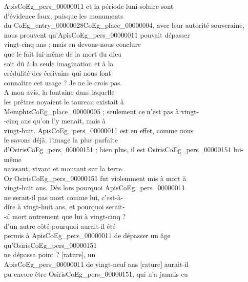 \documentclass{book}
\begin{document}
{\begin{paracol}{2}
\switchcolumn
\noindent Apis\gls{CoEg_pers_00000011} et la période luni-solaire sont\\
d’évidence faux, puisque les monuments\\
du \Gls{CoEg_entry_00000028}\gls{CoEg_place_00000004}, avec leur autorité souveraine,\\
nous prouvent qu’Apis\gls{CoEg_pers_00000011} pouvait dépasser\\
vingt-cinq ans ; mais en devons-nous conclure\\
que le fait lui-même de la mort du dieu\\
soit dû à la seule imagination et à la\\
crédulité des écrivains qui nous font\\
connaître cet usage ? Je ne le crois pas.\\
A mon avis, la fontaine dans laquelle\\
les prêtres noyaient le taureau existait à\\
Memphis\gls{CoEg_place_00000005} ; seulement ce n’est pas à vingt-\\
-cinq ans qu’on l’y menait, mais à\\
vingt-huit. Apis\gls{CoEg_pers_00000011} est en effet, comme nous\\
le savons déjà, l’image la plus parfaite\\
d’Osiris\gls{CoEg_pers_00000151} ; bien plus, il est Osiris\gls{CoEg_pers_00000151} lui-même\\
naissant, vivant et mourant sur la terre.\\
Or Osiris\gls{CoEg_pers_00000151} fut violemment mis à mort à\\
vingt-huit ans. Dès lors pourquoi Apis\gls{CoEg_pers_00000011}\\
ne serait-il pas mort comme lui, c’est-à-\\
dire à vingt-huit ans, et pourquoi serait-\\
-il mort autrement que lui à vingt-cinq ?\\
d’un autre côté pourquoi aurait-il été\\
permis à Apis\gls{CoEg_pers_00000011} de dépasser un âge qu’Osiris\gls{CoEg_pers_00000151}\\
ne dépassa point ? [rature], un\\
Apis\gls{CoEg_pers_00000011} de vingt-neuf ans [rature] aurait-il\\
pu encore être Osiris\gls{CoEg_pers_00000151}, qui n’a jamais eu\\

\end{paracol}}
\end{document}
